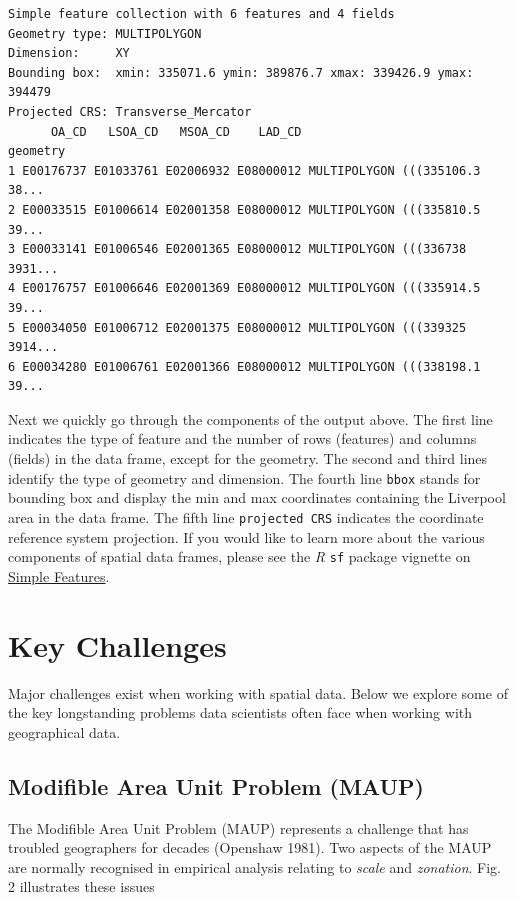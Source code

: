 \documentclass[
  letterpaper,
  DIV=11,
  numbers=noendperiod,
  oneside]{scrreprt}
\begin{document}
\begin{verbatim}
Simple feature collection with 6 features and 4 fields
Geometry type: MULTIPOLYGON
Dimension:     XY
Bounding box:  xmin: 335071.6 ymin: 389876.7 xmax: 339426.9 ymax: 394479
Projected CRS: Transverse_Mercator
      OA_CD   LSOA_CD   MSOA_CD    LAD_CD                       geometry
1 E00176737 E01033761 E02006932 E08000012 MULTIPOLYGON (((335106.3 38...
2 E00033515 E01006614 E02001358 E08000012 MULTIPOLYGON (((335810.5 39...
3 E00033141 E01006546 E02001365 E08000012 MULTIPOLYGON (((336738 3931...
4 E00176757 E01006646 E02001369 E08000012 MULTIPOLYGON (((335914.5 39...
5 E00034050 E01006712 E02001375 E08000012 MULTIPOLYGON (((339325 3914...
6 E00034280 E01006761 E02001366 E08000012 MULTIPOLYGON (((338198.1 39...
\end{verbatim}

Next we quickly go through the components of the output above. The first
line indicates the type of feature and the number of rows (features) and
columns (fields) in the data frame, except for the geometry. The second
and third lines identify the type of geometry and dimension. The fourth
line \texttt{bbox} stands for bounding box and display the min and max
coordinates containing the Liverpool area in the data frame. The fifth
line \texttt{projected\ CRS} indicates the coordinate reference system
projection. If you would like to learn more about the various components
of spatial data frames, please see the \emph{R} \texttt{sf} package
vignette on
\href{https://r-spatial.github.io/sf/articles/sf1.html}{Simple
Features}.

\section{Key Challenges}\label{key-challenges}

Major challenges exist when working with spatial data. Below we explore
some of the key longstanding problems data scientists often face when
working with geographical data.

\subsection{Modifible Area Unit Problem
(MAUP)}\label{modifible-area-unit-problem-maup}

The Modifible Area Unit Problem (MAUP) represents a challenge that has
troubled geographers for decades (Openshaw 1981). Two aspects of the
MAUP are normally recognised in empirical analysis relating to
\emph{scale} and \emph{zonation}. Fig. 2 illustrates these issues
\end{document}
